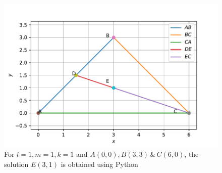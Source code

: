 \begin{figure}[!ht]
    \centering
    \includegraphics[width=\columnwidth]{./solutions/2/22/Ex1prob22.pdf}
    \caption{For $l=1,m=1,k=1$ and $A(0,0),B(3,3)\, $\&$\, C(6,0)$, the solution $E(3,1)$ is obtained using Python}
    \label{eq:solutions/2/22/f2}
\end{figure}
       
